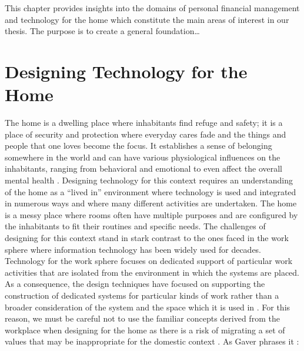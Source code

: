 This chapter provides insights into the domains of personal financial management and technology for the home which constitute the main areas of interest in our thesis. The purpose is to create a general foundation…

\section{Designing Technology for the Home}
The home is a dwelling place where inhabitants find refuge and safety; it is a place of security and protection where everyday cares fade and the things and people that one loves become the focus. It establishes a sense of belonging somewhere in the world and can have various physiological influences on the inhabitants, ranging from behavioral and emotional to even affect the overall mental health \cite{boutruche2008raising}. Designing technology for this context requires an understanding of the home as a “lived in” environment where technology is used and integrated in numerous ways and where many different activities are undertaken. The home is a messy place where rooms often have multiple purposes and are configured by the inhabitants to fit their routines and specific needs. The challenges of designing for this context stand in stark contrast to the ones faced in the work sphere where information technology has been widely used for decades. Technology for the work sphere focuses on dedicated support of particular work activities that are isolated from the environment in which the systems are placed. As a consequence, the design techniques have focused on supporting the construction of dedicated systems for particular kinds of work rather than a broader consideration of the system and the space which it is used in \cite{hughes1998understanding}. For this reason, we must be careful not to use the familiar concepts derived from the workplace when designing for the home as there is a risk of migrating a set of values that may be inappropriate for the domestic context \cite{crabtree2003finding}. As Gaver phrases it \cite{gaver2001designing}:



